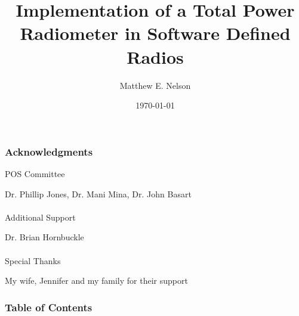 \documentclass[notes]{beamer}
\title[SDR Radiometer]{Implementation of a Total Power Radiometer in Software Defined Radios}
\author{Matthew E. Nelson}
\institute[ISU] 
{
Iowa State University \\
Electrical and Computer Engineering \ \\ 
\medskip
\textit{mnelson@iastate.edu} %
\ \\ \ \\MS Thesis Final Oral Presentation
}
\date{\today}
\begin{document}
\begin{frame}
\titlepage 
\end{frame}

\begin{frame}
\frametitle{Acknowledgments}
\begin{center}
POS Committee

Dr. Phillip Jones, Dr. Mani Mina, Dr. John Basart
\ \\ \ \\
Additional Support

Dr. Brian Hornbuckle
\ \\ \ \\
Special Thanks

My wife, Jennifer and my family for their support
\end{center}
\end{frame}

\begin{frame}
\frametitle{Table of Contents} 
\begin{multicols}{2}
\tableofcontents[hideallsubsections]
\end{multicols}
\end{frame}


\end{document}
